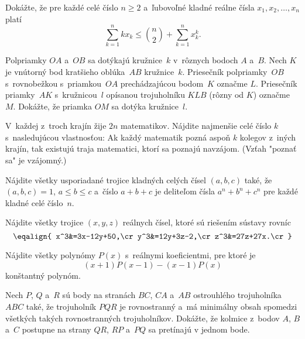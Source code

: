 {%
Dokážte, že pre každé celé číslo $n\ge 2$ a~ľubovoľné kladné reálne čísla $x_1, x_2, \dots, x_n$ platí
$$
\sum_{k=1}^n kx_k\le {n\choose 2} + \sum_{k=1}^n x_k^k.
$$}

{%
Polpriamky $OA$ a~$OB$ sa dotýkajú kružnice~$k$ v~rôznych bodoch $A$ a~$B$. Nech $K$ je vnútorný bod kratšieho oblúka~$AB$
kružnice~$k$. Priesečník polpriamky~$OB$ s~rovnobežkou s~priamkou~$OA$ prechádzajúcou bodom~$K$ označme $L$.
Priesečník priamky~$AK$ s~kružnicou~$l$ opísanou trojuholníku $KLB$ (rôzny od $K$) označme $M$. Dokážte,
že priamka $OM$ sa dotýka kružnice~$l$.}

{%
V~každej z~troch krajín žije $2n$ matematikov. Nájdite najmenšie celé číslo $k$ s~nasledujúcou vlastnosťou:
Ak každý matematik pozná aspoň $k$ kolegov z~iných krajín, tak existujú traja matematici, ktorí sa poznajú navzájom.
(Vzťah "poznať sa" je vzájomný.)}

{%
Nájdite všetky usporiadané trojice kladných celých čísel $(a,b,c)$ také,
že $(a,b,c)=1$, $a\le b\le c$ a~číslo $a+b+c$ je deliteľom čísla $a^n+b^n+c^n$ pre každé kladné celé číslo~$n$.}

{%
Nájdite všetky trojice $(x,y,z)$ reálnych čísel, ktoré sú riešením sústavy rovníc
$$\eqalign{
x^3&=3x-12y+50,\cr
y^3&=12y+3z-2,\cr
z^3&=27z+27x.\cr
}$$
}

{%
Nájdite všetky polynómy $P(x)$ s~reálnymi koeficientmi, pre ktoré je
$$
(x+1)P(x-1)-(x-1)P(x)
$$
konštantný polynóm.}

{%
Nech $P$, $Q$ a~$R$ sú body na stranách $BC$, $CA$ a~$AB$ ostrouhlého trojuholníka $ABC$ také, že trojuholník $PQR$ je rovnostranný a~má minimálny obsah spomedzi všetkých takých rovnostranných trojuholníkov. Dokážte, že kolmice z~bodov $A$, $B$ a~$C$ postupne na strany $QR$, $RP$ a~$PQ$ sa pretínajú v jednom bode.}


